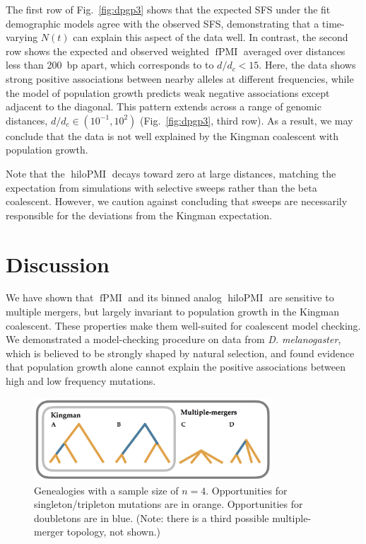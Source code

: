 \documentclass[11pt, letterpaper]{article}   	%
\newcommand{\fig}[1]{Fig.~\ref{#1}}
\DeclareMathOperator{\fpmi}{fPMI}
\DeclareMathOperator{\hilopmi}{hiloPMI}
\begin{document}
The first row of \fig{fig:dpgp3} shows that the expected SFS under the fit demographic models agree with the observed SFS, demonstrating that a time-varying $N(t)$ can explain this aspect of the data well.
In contrast, the second row shows the expected and observed weighted $\fpmi$ averaged over distances less than 200~bp apart, which corresponds to to $d/d_c < 15$.
Here, the data shows strong positive associations between nearby alleles at different frequencies, while the model of population growth predicts weak negative associations except adjacent to the diagonal.
This pattern extends across a range of genomic distances, $d/d_c \in (10^{-1}, 10^2)$ (\fig{fig:dpgp3}, third row).
As a result, we may conclude that the data is not well explained by the Kingman coalescent with population growth.

Note that the $\hilopmi$ decays toward zero at large distances, matching the expectation from simulations with selective sweeps rather than the beta coalescent.
However, we caution against concluding that sweeps are necessarily responsible for the deviations from the Kingman expectation.


\section*{Discussion}

We have shown that $\fpmi$ and its binned analog $\hilopmi$ are sensitive to multiple mergers, but largely invariant to population growth in the Kingman coalescent.
These properties make them well-suited for coalescent model checking.
We demonstrated a model-checking procedure on data from \textit{D. melanogaster}, which is believed to be strongly shaped by natural selection, and found evidence that population growth alone cannot explain the positive associations between high and low frequency mutations.

\begin{figure}
\centering
\includegraphics[width=3.5in]{figures/trees.png}
\caption{Genealogies with a sample size of $n=4$. Opportunities for singleton/tripleton mutations are in orange. Opportunities for doubletons are in blue. (Note: there is a third possible multiple-merger topology, not shown.) \label{fig:trees}}
\end{figure}
\end{document}
